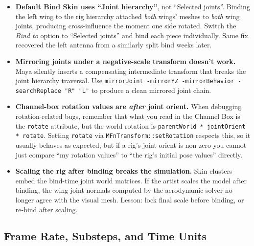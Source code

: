\documentclass[12pt]{article}
\begin{document}
\begin{itemize}
  \item \textbf{Default Bind Skin uses ``Joint hierarchy''}, not ``Selected
    joints''.  Binding the left wing to the rig hierarchy attached
    \emph{both} wings' meshes to \emph{both} wing joints, producing
    cross-influence the moment one side rotated.  Switch the
    \emph{Bind to} option to ``Selected joints'' and bind each piece
    individually.  Same fix recovered the left antenna from a similarly
    split bind weeks later.

  \item \textbf{Mirroring joints under a negative-scale transform doesn't
    work.}  Maya silently inserts a compensating intermediate transform
    that breaks the joint hierarchy traversal.  Use
    \texttt{mirrorJoint -mirrorYZ -mirrorBehavior -searchReplace "R" "L"}
    to produce a clean mirrored joint chain.

  \item \textbf{Channel-box rotation values are \emph{after} joint orient.}
    When debugging rotation-related bugs, remember that what you read in the
    Channel Box is the \texttt{rotate} attribute, but the world rotation is
    \texttt{parentWorld * jointOrient * rotate}.  Setting
    \texttt{rotate} via \texttt{MFnTransform::setRotation} respects this,
    so it usually behaves as expected, but if a rig's joint orient is
    non-zero you cannot just compare ``my rotation values'' to ``the rig's
    initial pose values'' directly.

  \item \textbf{Scaling the rig after binding breaks the simulation.}
    Skin clusters embed the bind-time joint world matrices.  If the
    artist scales the model after binding, the wing-joint normals computed
    by the aerodynamic solver no longer agree with the visual mesh.
    Lesson: lock final scale before binding, or re-bind after scaling.
\end{itemize}

\subsection*{Frame Rate, Substeps, and Time Units}
\end{document}

